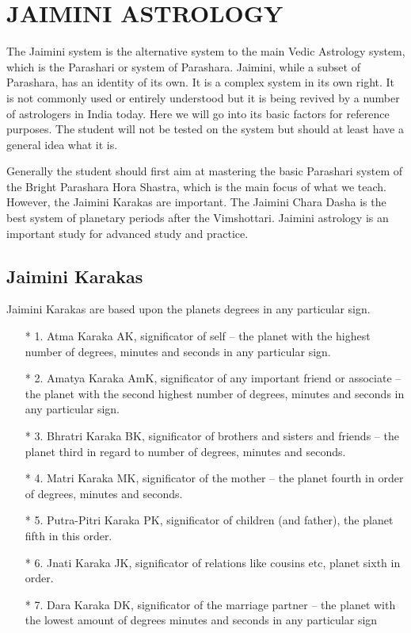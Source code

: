 \section{JAIMINI ASTROLOGY}
 

The Jaimini system is the alternative system to the main Vedic Astrology system, which is the Parashari or system of Parashara. Jaimini, while a subset of Parashara, has an identity of its own. It is a complex system in its own right. It is not commonly used or entirely understood but it is being revived by a number of astrologers in India today. Here we will go into its basic factors for reference purposes. The student will not be tested on the system but should at least have a general idea what it is.

 

Generally the student should first aim at mastering the basic Parashari system of the Bright Parashara Hora Shastra, which is the main focus of what we teach. However, the Jaimini Karakas are important. The Jaimini Chara Dasha is the best system of planetary periods after the Vimshottari. Jaimini astrology is an important study for advanced study and practice.

 

\subsection{Jaimini Karakas}
 

Jaimini Karakas are based upon the planets degrees in any particular sign.

 

\begin{enumerate}
\item[*] 1.    Atma Karaka AK, significator of self – the planet with the highest number of degrees, minutes and seconds in any particular sign.

\item[*] 2.    Amatya Karaka AmK, significator of any important friend or associate – the planet with the second highest number of degrees, minutes and seconds in any particular sign.

\item[*] 3.    Bhratri Karaka BK, significator of brothers and sisters and friends – the planet third in regard to number of degrees, minutes and seconds.

\item[*] 4.    Matri Karaka MK, significator of the mother – the planet fourth in order of degrees, minutes and seconds.

\item[*] 5.    Putra-Pitri Karaka PK, significator of children (and father), the planet fifth in this order.

\item[*] 6.    Jnati Karaka JK, significator of relations like cousins etc, planet sixth in order.

\item[*] 7.    Dara Karaka DK, significator of the marriage partner – the planet with the lowest amount of degrees minutes and seconds in any particular sign
\end{enumerate}
 

